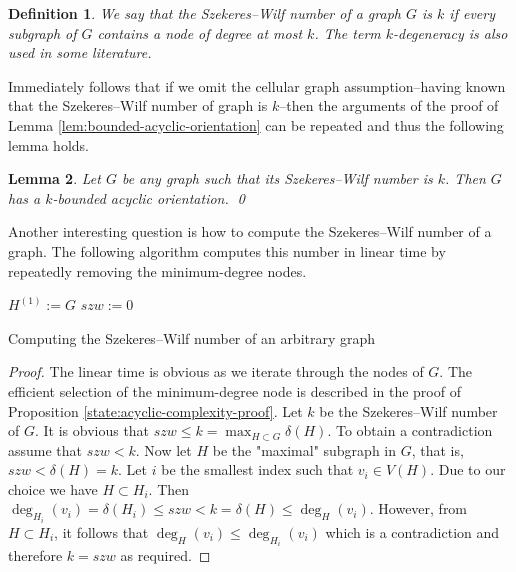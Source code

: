 \documentclass[a4paper, 12pt]{article}
\newtheorem{lem}{Lemma}[section]
\newtheorem{defin}[lem]{Definition}
\begin{document}
\begin{defin} We say that the Szekeres\---Wilf number of a graph $G$ is $k$ if every subgraph of $G$ contains a node of degree at most $k$. The term $k$-degeneracy is also used in some literature.
\end{defin}

Immediately follows that if we omit the cellular graph assumption\---having known that the Szekeres\---Wilf number of graph is $k$\---then the arguments of the proof of Lemma \ref{lem:bounded-acyclic-orientation} can be repeated and thus the following lemma holds.

\begin{lem} Let $G$ be any graph such that its Szekeres\---Wilf number is $k$. Then $G$ has a $k$-bounded acyclic orientation. \qed
\end{lem}

Another interesting question is how to compute the Szekeres\---Wilf number of a graph. The following algorithm \cite{Matula:1983:SOC:2402.322385} computes this number in linear time by repeatedly removing the minimum-degree nodes.

\begin{algorithm}\label{alg:szekeres-wilf-computation}
 $H^{(1)} := G$\;
 $szw := 0$\;
 \caption{Computing the Szekeres\---Wilf number of an arbitrary graph}
\end{algorithm}
\begin{proof}
The linear time is obvious as we iterate through the nodes of $G$. The efficient selection of the minimum-degree node is described in the proof of Proposition \ref{state:acyclic-complexity-proof}. Let $k$ be the Szekeres\---Wilf number of $G$. It is obvious that $szw \leqslant k = \max_{H \subset G} \delta(H)$. To obtain a contradiction assume that $szw < k$. Now let $H$ be the "maximal" subgraph in $G$, that is, $szw < \delta(H) = k$. Let $i$ be the smallest index such that $v_i \in V(H)$. Due to our choice we have $H \subset H_i$. Then $\deg_{H_i}(v_i) = \delta(H_i) \leqslant szw < k = \delta(H) \leqslant \deg_H(v_i)$. However, from $H \subset H_i$, it follows that $\deg_H(v_i) \leqslant \deg_{H_i}(v_i)$ which is a contradiction and therefore $k = szw$ as required.
\end{proof}
\end{document}
